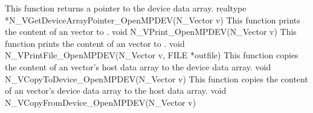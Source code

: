 {
 This function returns a pointer to the device data array.
}
{
 realtype *N\_VGetDeviceArrayPointer\_OpenMPDEV(N\_Vector v)
}
{
 This function prints the content of an {\nvecopenmpdev} vector to .
}
{
 void N\_VPrint\_OpenMPDEV(N\_Vector v)
}
{
 This function prints the content of an {\nvecopenmpdev} vector to .
}
{
 void N\_VPrintFile\_OpenMPDEV(N\_Vector v, FILE *outfile)
}
{
 This function copies the content of an {\nvecopenmpdev} vector's host data array
 to the device data array.
}
{
 void N\_VCopyToDevice\_OpenMPDEV(N\_Vector v)
}
{
 This function copies the content of an {\nvecopenmpdev} vector's device data array
 to the host data array.
}
{
  void N\_VCopyFromDevice\_OpenMPDEV(N\_Vector v)
}

